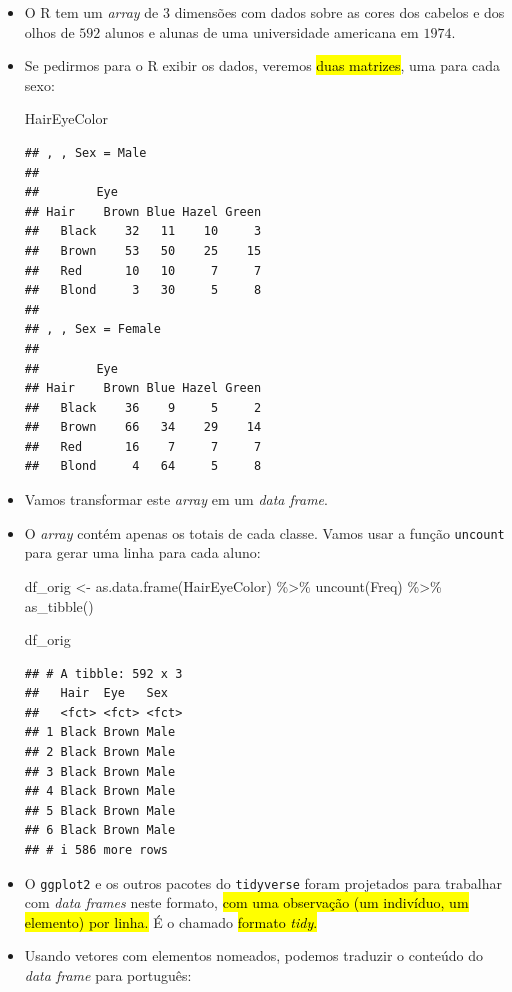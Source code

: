 \documentclass[
  11pt]{report}
\newenvironment{Shaded}{\begin{snugshade}}{\end{snugshade}}
\newcommand{\FunctionTok}[1]{\textcolor[rgb]{0.00,0.00,0.00}{#1}}
\newcommand{\NormalTok}[1]{#1}
\newcommand{\OtherTok}[1]{\textcolor[rgb]{0.56,0.35,0.01}{#1}}
\newcommand{\SpecialCharTok}[1]{\textcolor[rgb]{0.00,0.00,0.00}{#1}}
\renewenvironment{Shaded}{
    \begin{mdframed}[%
      roundcorner=2pt,%
      innerleftmargin=5pt,%
      innerrightmargin=5pt,%
      topline=true,%
      leftline=true,%
      rightline=true,%
      bottomline=true,%
      linewidth=0.5pt,%
      linecolor=black!20,%
      backgroundcolor=black!2,%
      skipabove=2ex,%
      skipbelow=2.5ex%
    ]%
  }
  {
    \end{mdframed}
  }
\begin{document}
\begin{itemize}
\item
  O R tem um \emph{array} de $3$ dimensões com dados sobre as cores dos cabelos e dos olhos de $592$ alunos e alunas de uma universidade americana em $1974$.
\item
  Se pedirmos para o R exibir os dados, veremos {\hl{duas matrizes}}, uma para cada sexo:

\begin{Shaded}
\begin{Highlighting}[]
\NormalTok{HairEyeColor}
\end{Highlighting}
\end{Shaded}

\begin{verbatim}
## , , Sex = Male
## 
##        Eye
## Hair    Brown Blue Hazel Green
##   Black    32   11    10     3
##   Brown    53   50    25    15
##   Red      10   10     7     7
##   Blond     3   30     5     8
## 
## , , Sex = Female
## 
##        Eye
## Hair    Brown Blue Hazel Green
##   Black    36    9     5     2
##   Brown    66   34    29    14
##   Red      16    7     7     7
##   Blond     4   64     5     8
\end{verbatim}
\item
  Vamos transformar este \emph{array} em um \emph{data frame}.
\item
  O \emph{array} contém apenas os totais de cada classe. Vamos usar a função \texttt{uncount} para gerar uma linha para cada aluno:

\begin{Shaded}
\begin{Highlighting}[]
\NormalTok{df\_orig }\OtherTok{\textless{}{-}} \FunctionTok{as.data.frame}\NormalTok{(HairEyeColor) }\SpecialCharTok{\%\textgreater{}\%} 
  \FunctionTok{uncount}\NormalTok{(Freq) }\SpecialCharTok{\%\textgreater{}\%} 
  \FunctionTok{as\_tibble}\NormalTok{()}

\NormalTok{df\_orig}
\end{Highlighting}
\end{Shaded}

\begin{verbatim}
## # A tibble: 592 x 3
##   Hair  Eye   Sex  
##   <fct> <fct> <fct>
## 1 Black Brown Male 
## 2 Black Brown Male 
## 3 Black Brown Male 
## 4 Black Brown Male 
## 5 Black Brown Male 
## 6 Black Brown Male 
## # i 586 more rows
\end{verbatim}
\item
  O \texttt{ggplot2} e os outros pacotes do \texttt{tidyverse} foram projetados para trabalhar com \emph{data frames} neste formato, {\hl{com uma observação (um indivíduo, um elemento) por linha.}} É o chamado {\hl{formato \emph{tidy}.}}
\item
  Usando vetores com elementos nomeados, podemos traduzir o conteúdo do \emph{data frame} para português:


\end{itemize}
\end{document}
